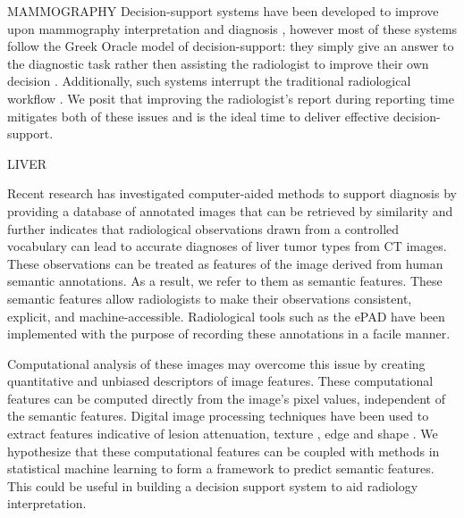 MAMMOGRAPHY
Decision-support systems have been developed to improve upon mammography interpretation and diagnosis \cite{Garg:2005cb, Burnside:2000wl, ElizabethS:2005gc, Rubin:2005jg}, however most of these systems follow the Greek Oracle model of decision-support: they simply give an answer to the diagnostic task rather then assisting the radiologist to improve their own decision \cite{Miller:1990wg, Friedman:2009dx}. Additionally, such systems interrupt the traditional radiological workflow \cite{Morgan:2011ct}. We posit that improving the radiologist’s report during reporting time mitigates both of these issues and is the ideal time to deliver effective decision-support.

LIVER

Recent research has investigated computer-aided methods to support diagnosis by providing a database of annotated images that can be retrieved by similarity\cite{Napel:2010es} and further indicates that radiological observations drawn from a controlled vocabulary can lead to accurate diagnoses of liver tumor types from CT images\cite{Korenblum:2011gx}. These observations can be treated as features of the image derived from human semantic annotations. As a result, we refer to them as semantic features. These semantic features allow radiologists to make their observations consistent, explicit, and machine-accessible. Radiological tools such as the ePAD \cite{Rubin:2008uz} have been implemented with the purpose of recording these annotations in a facile manner.

Computational analysis of these images may overcome this issue by creating quantitative and unbiased descriptors of image features. These computational features can be computed directly from the image's pixel values, independent of the semantic features. Digital image processing techniques have been used to extract features indicative of lesion attenuation, texture \cite{Strela:1999ei, Zhao:2004gc}, edge and shape \cite{Hong:2006fl, Manay:2006cg, MRangayyan:2005td, Xu:2012bh}. We hypothesize that these computational features can be coupled with methods in statistical machine learning to form a framework to predict semantic features. This could be useful in building a decision support system to aid radiology interpretation.